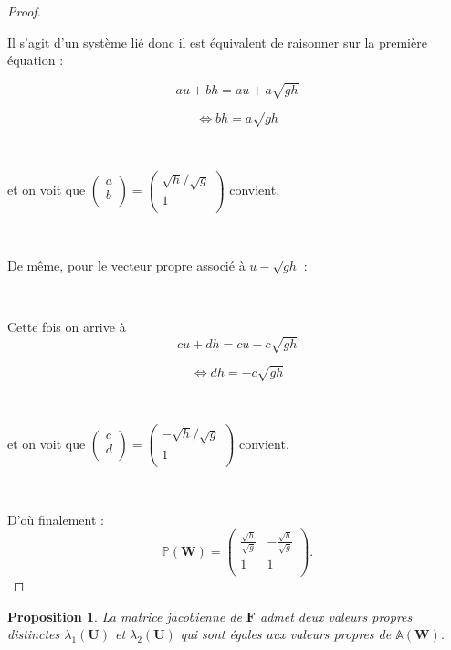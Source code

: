 \documentclass[
11pt, %
francais, %
singlespacing, %
headsepline, %
]{MastersDoctoralThesis} %
\newtheorem{prop}{Proposition}
\begin{document}
\begin{proof}
\

Il s'agit d'un système lié donc il est équivalent de raisonner sur la première équation :

$$au+bh = au+ a\sqrt{gh}$$

$$\Leftrightarrow bh = a\sqrt{gh}$$

\

et on voit que $\begin{pmatrix}
   a\\
   b\\
\end{pmatrix} = \begin{pmatrix}
   \sqrt{h}/\sqrt{g}\\
   1\\
\end{pmatrix}$ convient.

\

De même, \underline{pour le vecteur propre associé à $u -\sqrt{gh}$ :}

\

Cette fois on arrive à $$cu+dh = cu- c\sqrt{gh}$$

$$\Leftrightarrow dh = -c\sqrt{gh}$$

\

et on voit que $\begin{pmatrix}
   c\\
   d\\
\end{pmatrix} = \begin{pmatrix}
   -\sqrt{h}/\sqrt{g}\\
   1\\
\end{pmatrix}$ convient.

\

D'où finalement : $$\mathbb{P}(\textbf{W}) =\begin{pmatrix}
   \frac{\sqrt{h}}{\sqrt{g}} & -\frac{\sqrt{h}}{\sqrt{g}} \\
   1 & 1  \\
\end{pmatrix}.$$

\end{proof}


\begin{prop}

La matrice jacobienne de $\textbf{F}$ admet deux valeurs propres distinctes $\lambda_{1}(\textbf{U})$ et $\lambda_{2}(\textbf{U})$  qui sont égales aux valeurs 
propres de $\mathbb{A}(\textbf{W}).$

\end{prop}
\end{document}
